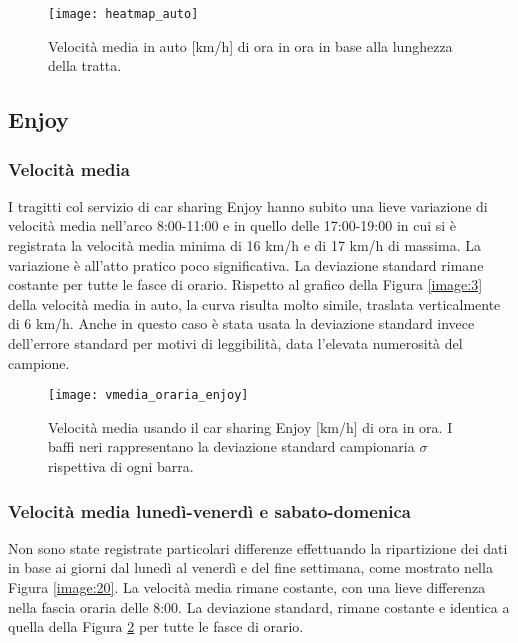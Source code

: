 \begin{figure}[H]
	\centering
	\texttt{[image: heatmap\_auto]}
	\caption{Velocità media in auto [km/h] di ora in ora in base alla lunghezza della tratta.}
	\label{image:6}
\end{figure}

\pagebreak

\subsection{Enjoy}

\subsubsection{Velocità media}

I tragitti col servizio di car sharing Enjoy hanno subito una lieve variazione di velocità media nell'arco 8:00-11:00 e in quello delle 17:00-19:00 in cui si è registrata la velocità media minima di 16 km/h e di 17 km/h di massima. La variazione è all'atto pratico poco significativa. La deviazione standard rimane costante per tutte le fasce di orario. Rispetto al grafico della Figura \ref{image:3} della velocità media in auto, la curva risulta molto simile, traslata verticalmente di 6 km/h. Anche in questo caso è stata usata la deviazione standard invece dell'errore standard per motivi di leggibilità, data l'elevata numerosità del campione.

\begin{figure}[H]
	\centering
	\texttt{[image: vmedia\_oraria\_enjoy]}
	\caption{Velocità media usando il car sharing Enjoy [km/h] di ora in ora.  I baffi neri rappresentano la deviazione standard campionaria $\sigma$ rispettiva di ogni barra.}
	\label{image:7}
\end{figure}

\subsubsection{Velocità media lunedì-venerdì e sabato-domenica}

Non sono state registrate particolari differenze effettuando la ripartizione dei dati in base ai giorni dal lunedì al venerdì e del fine settimana, come mostrato nella Figura \ref{image:20}. La velocità media rimane costante, con una lieve differenza nella fascia oraria delle 8:00. La deviazione standard, rimane costante e identica a quella della Figura \ref{image:7} per tutte le fasce di orario.

